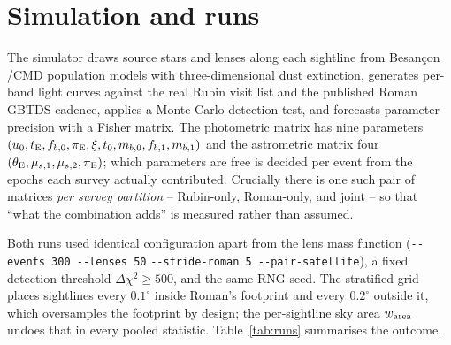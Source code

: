 \documentclass[english,10pt,a4paper]{article}
\newcommand{\tE}{t_{\rm E}}
\newcommand{\piE}{\pi_{\rm E}}
\newcommand{\tetE}{\theta_{\rm E}}
\begin{document}
\section{Simulation and runs}

The simulator draws source stars and lenses along each sightline from Besan\c{c}on \citep{Robin2003}/CMD
population models with three-dimensional dust extinction, generates per-band light curves
against the real Rubin visit list and the published Roman GBTDS cadence, applies a Monte Carlo
detection test, and forecasts parameter precision with a Fisher matrix. The photometric matrix
has nine parameters $(u_0,\tE,f_{b,0},\piE,\xi,t_0,m_{b,0},f_{b,1},m_{b,1})$ and the astrometric
matrix four $(\tetE,\mu_{s,1},\mu_{s,2},\piE)$; which parameters are free is decided per event
from the epochs each survey actually contributed. Crucially there is one such pair of matrices
\emph{per survey partition} -- Rubin-only, Roman-only, and joint -- so that ``what the
combination adds'' is measured rather than assumed.

Both runs used identical configuration apart from the lens mass function
(\verb|--events 300 --lenses 50| \verb|--stride-roman 5 --pair-satellite|), a fixed detection
threshold $\Delta\chi^2 \ge 500$, and the same RNG seed. The stratified grid places sightlines
every $0.1^\circ$ inside Roman's footprint and every $0.2^\circ$ outside it, which oversamples
the footprint by design; the per-sightline sky area $w_{\rm area}$ undoes that in every pooled
statistic. Table~\ref{tab:runs} summarises the outcome.
\end{document}
